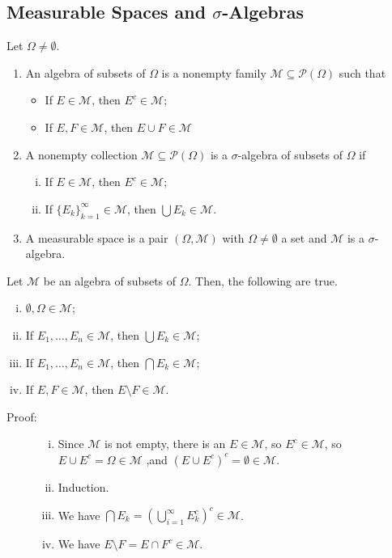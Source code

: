\documentclass[9pt]{extarticle}
\begin{document}
  \subsection{Measurable Spaces and $\sigma$-Algebras}%
  Let $\Omega \neq \emptyset$.
  \begin{enumerate}[(1)]
    \item An algebra of subsets of $\Omega$ is a nonempty family $\mathcal{M}\subseteq \mathcal{P}(\Omega)$ such that
      \begin{itemize}
        \item If $E\in \mathcal{M}$, then $E^c\in \mathcal{M}$;
        \item If $E,F\in \mathcal{M}$, then $E\cup F\in \mathcal{M}$
      \end{itemize}
    \item A nonempty collection $\mathcal{M}\subseteq \mathcal{P}(\Omega)$ is a $\sigma$-algebra of subsets of $\Omega$ if
      \begin{enumerate}[(i)]
        \item If $E\in \mathcal{M}$, then $E^{c}\in \mathcal{M}$;
        \item If $\{E_k\}_{k=1}^{\infty}\in \mathcal{M}$, then $\bigcup E_k \in \mathcal{M}$.
      \end{enumerate}
    \item A measurable space is a pair $(\Omega,\mathcal{M})$ with $\Omega \neq \emptyset$ a set and $\mathcal{M}$ is a $\sigma$-algebra.
  \end{enumerate}
  Let $\mathcal{M}$ be an algebra of subsets of $\Omega$. Then, the following are true.
  \begin{enumerate}[(i)]
    \item $\emptyset,\Omega \in \mathcal{M}$;
    \item If $E_1,\dots,E_n \in \mathcal{M}$, then $\bigcup E_k \in \mathcal{M}$;
    \item If $E_1,\dots,E_n \in \mathcal{M}$, then $\bigcap E_k \in \mathcal{M}$;
    \item If $E,F\in \mathcal{M}$, then $E\setminus F\in \mathcal{M}$.
  \end{enumerate}
  \begin{description}
    \item[Proof:] \hfill
      \begin{enumerate}[(i)]
        \item Since $\mathcal{M}$ is not empty, there is an $E\in \mathcal{M}$, so $E^c\in \mathcal{M}$, so $E\cup E^{c} = \Omega \in \mathcal{M}$ ,and $(E\cup E^{c})^{c} = \emptyset \in \mathcal{M}$.
        \item Induction.
        \item We have $\bigcap E_k = \left(\bigcup_{i=1}^{\infty}E_k^c\right)^c \in \mathcal{M}$.
        \item We have $E\setminus F = E\cap F^{c}\in \mathcal{M}$.
      \end{enumerate}
  \end{description}
\end{document}
